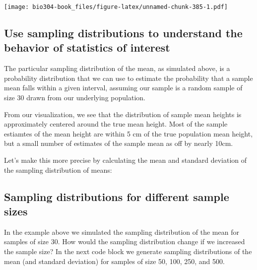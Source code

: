 \documentclass[]{book}
\newenvironment{Shaded}{\begin{snugshade}}{\end{snugshade}}
\newcommand{\CommentTok}[1]{\textcolor[rgb]{0.56,0.35,0.01}{\textit{#1}}}
\newcommand{\DataTypeTok}[1]{\textcolor[rgb]{0.13,0.29,0.53}{#1}}
\newcommand{\FloatTok}[1]{\textcolor[rgb]{0.00,0.00,0.81}{#1}}
\newcommand{\KeywordTok}[1]{\textcolor[rgb]{0.13,0.29,0.53}{\textbf{#1}}}
\newcommand{\NormalTok}[1]{#1}
\newcommand{\OperatorTok}[1]{\textcolor[rgb]{0.81,0.36,0.00}{\textbf{#1}}}
\newcommand{\StringTok}[1]{\textcolor[rgb]{0.31,0.60,0.02}{#1}}
\theoremstyle{definition}
\theoremstyle{definition}
\theoremstyle{definition}
\theoremstyle{remark}
\begin{document}
\texttt{[image: bio304-book\_files/figure-latex/unnamed-chunk-385-1.pdf]}

\hypertarget{use-sampling-distributions-to-understand-the-behavior-of-statistics-of-interest}{%
\subsection{Use sampling distributions to understand the behavior of
statistics of
interest}\label{use-sampling-distributions-to-understand-the-behavior-of-statistics-of-interest}}

The particular sampling distribution of the mean, as simulated above, is
a probability distribution that we can use to estimate the probability
that a sample mean falls within a given interval, assuming our sample is
a random sample of size 30 drawn from our underlying population.

From our visualization, we see that the distribution of sample mean
heights is approximately centered around the true mean height. Most of
the sample estiamtes of the mean height are within 5 cm of the true
population mean height, but a small number of estimates of the sample
mean as off by nearly 10cm.

Let's make this more precise by calculating the mean and standard
deviation of the sampling distribution of means:

\begin{Shaded}
\end{Shaded}

\hypertarget{sampling-distributions-for-different-sample-sizes}{%
\subsection{Sampling distributions for different sample
sizes}\label{sampling-distributions-for-different-sample-sizes}}

In the example above we simulated the sampling distribution of the mean
for samples of size 30. How would the sampling distribution change if we
increased the sample size? In the next code block we generate sampling
distributions of the mean (and standard deviation) for samples of size
50, 100, 250, and 500.
\end{document}
